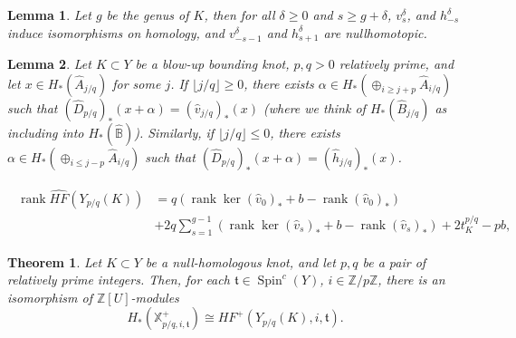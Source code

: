 \documentclass[10pt,a4paper]{amsart}
\newtheorem{lemma}{Lemma}
\newtheorem{theorem}{Theorem}
\newcommand{\B}{{\mathbb{B}}}
\DeclareMathOperator{\Spin}{Spin}
\newcommand{\Z}{{\mathbb{Z}}}
\renewcommand{\frak}{\mathfrak}
\DeclareMathOperator{\rank}{rank}
\newcommand{\wh}{\widehat}
\begin{document}
\begin{lemma}\label{lem:genus-finiteness}
Let $g$ be the genus of $K$, then for all $\delta\ge 0$ and $s\ge g+\delta$, $v_s^\delta$, and $h_{-s}^\delta$ induce isomorphisms on homology, and $v_{-s-1}^\delta$ and $h_{s+1}^\delta$ are nullhomotopic.
\end{lemma}

\begin{lemma}\label{lem:cancellation-general}
Let $K\subset Y$ be a blow-up bounding knot, $p,q>0$ relatively prime, and let $x\in H_*(\wh A_{j/q})$ for some $j$. If $\lfloor j/q\rfloor\ge 0$, there exists $\alpha\in H_*(\oplus_{i\ge j+p}\wh A_{i/q})$ such that $(\wh D_{p/q})_*(x+\alpha)=(\wh v_{j/q})_*(x)$ (where we think of $H_*(\wh B_{j/q})$ as including into $H_*(\wh\B)$). Similarly, if $\lfloor j/q\rfloor\le 0$, there exists $\alpha\in H_*(\oplus_{i\le j-p}\wh A_{i/q})$ such that $(\wh D_{p/q})_*(x+\alpha)=(\wh h_{j/q})_*(x)$.
\end{lemma}

\begin{align}\label{eq:rank-formula-pos-general}
\begin{split}
    \rank \wh{HF}(Y_{p/q}(K)) &= q(\rank\ker(\wh v_0)_*+b-\rank(\wh v_0)_*) \\
    &+2q\sum_{s=1}^{g-1}(\rank\ker(\wh v_s)_*+b-\rank(\wh v_s)_*)+ 2t_K^{p/q}-pb,
\end{split}
\end{align}

\begin{theorem}\label{thm:rational-surgery-formula}
Let $K\subset Y$ be a null-homologous knot, and let $p,q$ be a pair of relatively prime integers. Then, for each $\frak t\in\Spin^c(Y)$, $i\in\Z/p\Z$, there is an isomorphism of $\Z[U]$-modules
$$H_*(\mathbb X_{p/q,i,\frak t}^+)\cong HF^+(Y_{p/q}(K),i,\frak t).$$
\end{theorem}
\end{document}
